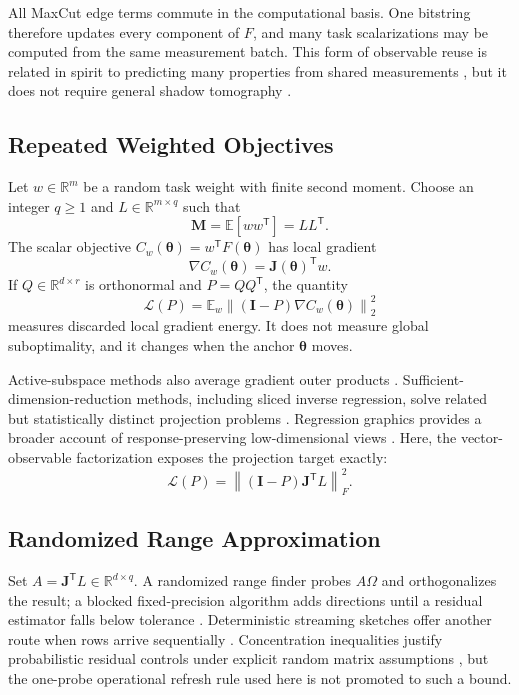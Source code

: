 \documentclass[aps,prx,reprint,superscriptaddress,floatfix]{revtex4-2}
\newcommand{\E}{\mathbb{E}}
\newcommand{\R}{\mathbb{R}}
\newcommand{\J}{\mathbf{J}}
\newcommand{\M}{\mathbf{M}}
\newcommand{\I}{\mathbf{I}}
\newcommand{\trans}{\mathsf{T}}
\newcommand{\norm}[1]{\left\lVert #1\right\rVert}
\begin{document}
All MaxCut edge terms commute in the computational basis.  One bitstring
therefore updates every component of $F$, and many task scalarizations may be
computed from the same measurement batch.  This form of observable reuse is
related in spirit to predicting many properties from shared measurements
\citep{huang2020shadows}, but it does not require general shadow tomography
\citep{aaronson2018shadow}.

\subsection{Repeated Weighted Objectives}

Let $w\in\R^m$ be a random task weight with finite second moment.  Choose an
integer $q\ge1$ and $L\in\R^{m\times q}$ such that
\begin{equation}
 \M=\E[ww^{\trans}]=LL^{\trans}.
 \label{eq:moment}
\end{equation}
The scalar objective $C_w(\bm\theta)=w^{\trans}F(\bm\theta)$ has local
gradient
\begin{equation}
 \nabla C_w(\bm\theta)=\J(\bm\theta)^{\trans}w.
 \label{eq:chain}
\end{equation}
If $Q\in\R^{d\times r}$ is orthonormal and $P=QQ^{\trans}$, the quantity
\begin{equation}
 \mathcal L(P)=
 \E_w\norm{(\I-P)\nabla C_w(\bm\theta)}_2^2
 \label{eq:loss}
\end{equation}
measures discarded local gradient energy.  It does not measure global
suboptimality, and it changes when the anchor $\bm\theta$ moves.

Active-subspace methods also average gradient outer products
\citep{constantine2015active}.  Sufficient-dimension-reduction methods,
including sliced inverse regression, solve related but statistically distinct
projection problems \citep{li1991sliced}.  Regression graphics provides a
broader account of response-preserving low-dimensional views
\citep{cook1998regression}.  Here, the vector-observable factorization exposes
the projection target exactly:
\begin{equation}
 \mathcal L(P)=\norm{(\I-P)\J^{\trans}L}_F^2.
 \label{eq:factorloss}
\end{equation}

\subsection{Randomized Range Approximation}

Set $A=\J^{\trans}L\in\R^{d\times q}$.  A randomized range finder probes
$A\Omega$ and orthogonalizes the result; a blocked fixed-precision algorithm
adds directions until a residual estimator falls below tolerance
\citep{woodruff2014sketching}.  Deterministic streaming sketches offer another
route when rows arrive sequentially \citep{liberty2013simple}.  Concentration
inequalities justify probabilistic residual controls under explicit random
matrix assumptions \citep{tropp2015matrix}, but the one-probe operational
refresh rule used here is not promoted to such a bound.
\end{document}
